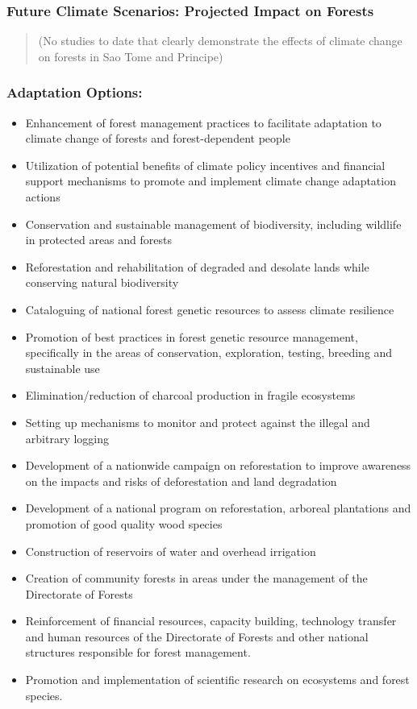 \documentclass[
]{book}
\providecommand{\tightlist}{%
  \setlength{\itemsep}{0pt}\setlength{\parskip}{0pt}}
\begin{document}
\hypertarget{future-climate-scenarios-projected-impact-on-forests-1}{%
\subsubsection{Future Climate Scenarios: Projected Impact on Forests}\label{future-climate-scenarios-projected-impact-on-forests-1}}

\begin{quote}
(No studies to date that clearly demonstrate the effects of climate change on forests in Sao Tome and Principe)
\end{quote}

\hypertarget{adaptation-options-15}{%
\subsubsection{Adaptation Options:}\label{adaptation-options-15}}

\begin{itemize}
\tightlist
\item
  Enhancement of forest management practices to facilitate adaptation to climate change of forests and forest-dependent people
\item
  Utilization of potential benefits of climate policy incentives and financial support mechanisms to promote and implement climate change adaptation actions
\item
  Conservation and sustainable management of biodiversity, including wildlife in protected areas and forests
\item
  Reforestation and rehabilitation of degraded and desolate lands while conserving natural biodiversity
\item
  Cataloguing of national forest genetic resources to assess climate resilience
\item
  Promotion of best practices in forest genetic resource management, specifically in the areas of conservation, exploration, testing, breeding and sustainable use
\item
  Elimination/reduction of charcoal production in fragile ecosystems
\item
  Setting up mechanisms to monitor and protect against the illegal and arbitrary logging
\item
  Development of a nationwide campaign on reforestation to improve awareness on the impacts and risks of deforestation and land degradation
\item
  Development of a national program on reforestation, arboreal plantations and promotion of good quality wood species
\item
  Construction of reservoirs of water and overhead irrigation
\item
  Creation of community forests in areas under the management of the Directorate of Forests
\item
  Reinforcement of financial resources, capacity building, technology transfer and human resources of the Directorate of Forests and other national structures responsible for forest management.
\item
  Promotion and implementation of scientific research on ecosystems and forest species.
\end{itemize}
\end{document}
